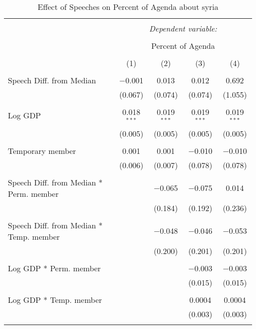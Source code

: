 
\begin{table}[!htbp] \centering 
  \caption{Effect of Speeches on Percent of Agenda about syria} 
  \label{} 
\begin{tabular}{@{\extracolsep{5pt}}lcccc} 
\\[-1.8ex]\hline 
\hline \\[-1.8ex] 
 & \multicolumn{4}{c}{\textit{Dependent variable:}} \\ 
\cline{2-5} 
\\[-1.8ex] & \multicolumn{4}{c}{Percent of Agenda} \\ 
\\[-1.8ex] & (1) & (2) & (3) & (4)\\ 
\hline \\[-1.8ex] 
 Speech Diff. from Median & $-$0.001 & 0.013 & 0.012 & 0.692 \\ 
  & (0.067) & (0.074) & (0.074) & (1.055) \\ 
  & & & & \\ 
 Log GDP & 0.018$^{***}$ & 0.019$^{***}$ & 0.019$^{***}$ & 0.019$^{***}$ \\ 
  & (0.005) & (0.005) & (0.005) & (0.005) \\ 
  & & & & \\ 
 Temporary member & 0.001 & 0.001 & $-$0.010 & $-$0.010 \\ 
  & (0.006) & (0.007) & (0.078) & (0.078) \\ 
  & & & & \\ 
 Speech Diff. from Median * Perm. member &  & $-$0.065 & $-$0.075 & 0.014 \\ 
  &  & (0.184) & (0.192) & (0.236) \\ 
  & & & & \\ 
 Speech Diff. from Median * Temp. member &  & $-$0.048 & $-$0.046 & $-$0.053 \\ 
  &  & (0.200) & (0.201) & (0.201) \\ 
  & & & & \\ 
 Log GDP * Perm. member &  &  & $-$0.003 & $-$0.003 \\ 
  &  &  & (0.015) & (0.015) \\ 
  & & & & \\ 
 Log GDP * Temp. member &  &  & 0.0004 & 0.0004 \\ 
  &  &  & (0.003) & (0.003) \\ 
  & & & & \\ 

\end{tabular}
\end{table}
